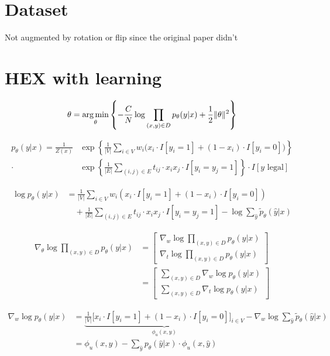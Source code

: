 \documentclass[11pt,a4paper]{article}
\newcommand{\argmin}{\operatornamewithlimits{arg\,min}}
\begin{document}
\section{Dataset}

Not augmented by rotation or flip since the original paper didn't


\section{HEX with learning}

\[\theta=\argmin_\theta\left\{-\frac{C}{N}\log\prod_{(x,y)\in D}p_\theta(y|x)+\frac{1}{2}\|\theta\|^2\right\}\]

\begin{align*}
p_\theta(y|x)=\frac{1}{Z(x)}&\exp\left\{\frac{1}{|V|}\sum_{i\in V}w_i\big(x_i\cdot I[y_i=1]+(1-x_i)\cdot I[y_i=0]\big)\right\}\\
\cdot&\exp\left\{\frac{1}{|E|}\sum_{(i,j)\in E}t_{ij}\cdot x_ix_j\cdot I[y_i=y_j=1]\right\}\cdot I[y\text{ legal}]
\end{align*}

\begin{align*}
\log p_\theta(y|x)&=\frac{1}{|V|}\sum_{i\in V}w_i(x_i\cdot I[y_i=1]+(1-x_i)\cdot I[y_i=0])\\
&\quad+\frac{1}{|E|}\sum_{(i,j)\in E}t_{ij}\cdot x_ix_j\cdot I[y_i=y_j=1]-\log\sum_{\hat{y}}\tilde{p}_\theta(\hat{y}|x)
\end{align*}

\begin{align*}
\nabla_\theta\log\prod_{(x,y)\in D}p_\theta(y|x)&=\begin{bmatrix}
\nabla_w\log\prod_{(x,y)\in D}p_\theta(y|x)\\ 
\nabla_t\log\prod_{(x,y)\in D}p_\theta(y|x)
\end{bmatrix}\\
&=\begin{bmatrix}
\sum_{(x,y)\in D}\nabla_w\log p_\theta(y|x)\\ 
\sum_{(x,y)\in D}\nabla_t\log p_\theta(y|x)
\end{bmatrix}
\end{align*}

\begin{align*}
\nabla_w\log p_\theta(y|x)&=\underbrace{\frac{1}{|V|}\Big[x_i\cdot I[y_i=1]+(1-x_i)\cdot I[y_i=0]\Big]_{i\in V}}_{\phi_u(x,y)}-\nabla_w\log\sum_{\hat{y}}\tilde{p}_\theta(\hat{y}|x)\\
&=\phi_u(x,y)-\sum_{\hat{y}}p_\theta(\hat{y}|x)\cdot\phi_u(x,\hat{y})
\end{align*}
\end{document}
